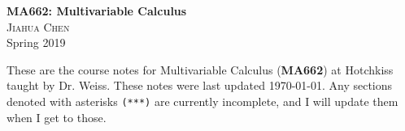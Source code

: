 \documentclass[12pt, letterpaper, dvipsnames]{article} %
\begin{document}
\thispagestyle{empty}
\begin{center}\large \textbf{MA662: Multivariable Calculus} \\[12pt]

	\small \textsc{Jiahua Chen}	\\[12pt]
	
	Spring 2019\end{center}
	\vspace{2em}
	
	\begin{changemargin}{.7in}{.7in} 
	These are the course notes for Multivariable Calculus (\textbf{MA662}) at Hotchkiss taught by Dr. Weiss. These notes were last updated \today. Any sections denoted with asterisks \texttt{(***)} are currently incomplete, and I will update them when I get to those.  
	\end{changemargin}
	





















\end{document}
